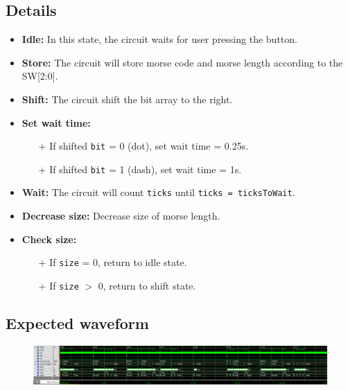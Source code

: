 \documentclass[13pt,a4paper]{report}
\begin{document}
\subsection{Details}
\begin{itemize}
\item {\bf Idle:} In this state, the circuit waits for user pressing the button.
\item {\bf Store:} The circuit will store morse code and morse length according to the SW[2:0].
\item {\bf Shift:} The circuit shift the bit array to the right.
\item {\bf Set wait time:}
\begin{itemize}
\item[$+$] If shifted \texttt{bit} = 0 (dot), set wait time = 0.25s.
\item[$+$] If shifted \texttt{bit} = 1 (dash), set wait time = 1s.
\end{itemize}

\item {\bf Wait:} The circuit will count \texttt{ticks} until \texttt{ticks = ticksToWait}.
\item {\bf Decrease size:} Decrease size of morse length.
\item {\bf Check size:}
\begin{itemize}
\item[$+$] If \texttt{size} = 0, return to idle state.
\item[$+$] If \texttt{size} $>$ 0, return to shift state.
\end{itemize}
\end{itemize}

\subsection{Expected waveform}
\begin{figure}[H]
\centering
\includegraphics[scale=0.35]{images/Exc5_waveform.png}
\end{figure}
\end{document}
